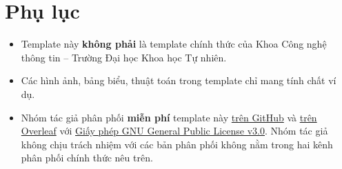 \section{Phụ lục}
\begin{itemize}
    \item Template này \textbf{không phải} là template chính thức của Khoa Công nghệ thông tin {--} Trường Đại học Khoa học Tự nhiên.
    \item Các hình ảnh, bảng biểu, thuật toán trong template chỉ mang tính chất ví dụ.
    \item Nhóm tác giả phân phối \textbf{miễn phí} template này \href{https://github.com/khongsomeo/hcmus-unofficial-report-template}{trên GitHub} và \href{https://www.overleaf.com/latex/templates/hcmus-report-template/zyrhmsxynwqs}{trên Overleaf} với \href{https://github.com/khongsomeo/hcmus-unofficial-report-template/blob/main/LICENSE}{Giấy phép GNU General Public License v3.0}. Nhóm tác giả không chịu trách nhiệm với các bản phân phối không nằm trong hai kênh phân phối chính thức nêu trên.
\end{itemize}
